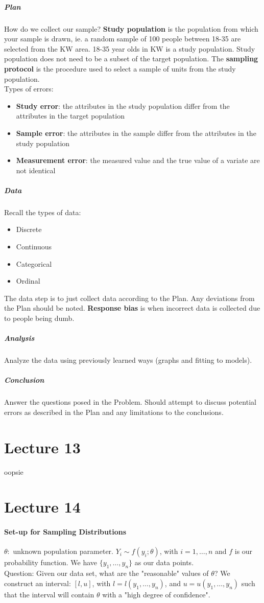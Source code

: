 \documentclass[10pt,letter]{article}
\theoremstyle{plain}
\theoremstyle{definition}
\begin{document}
\subparagraph{Plan}
How do we collect our sample? \textbf{Study population} is the population from which your sample is drawn, ie. a random sample of 100 people between 18-35 are selected from the KW area. 18-35 year olds in KW is a study population. Study population does not need to be a subset of the target population. The \textbf{sampling protocol} is the procedure used to select a sample of units from the study population.\\ 
Types of errors: 
\begin{itemize}
    \item \textbf{Study error}: the attributes in the study population differ from the attributes in the target population
    \item \textbf{Sample error}: the attributes in the sample differ from the attributes in the study population 
    \item \textbf{Measurement error}: the measured value and the true value of a variate are not identical
\end{itemize}


\subparagraph{Data}
Recall the types of data:
\begin{itemize}
    \item Discrete
    \item Continuous
    \item Categorical
    \item Ordinal
\end{itemize}
The data step is to just collect data according to the Plan. Any deviations from the Plan should be noted. \textbf{Response bias} is when incorrect data is collected due to people being dumb.  

\subparagraph{Analysis}
Analyze the data using previously learned ways (graphs and fitting to models). 
\subparagraph{Conclusion}
Answer the questions posed in the Problem. Should attempt to discuss potential errors as described in the Plan and any limitations to the conclusions.

\section*{Lecture 13}
oopsie

\section*{Lecture 14}
\paragraph{Set-up for Sampling Distributions}
$\theta:$ unknown population parameter. $Y_i\sim f(y_i;\theta)$, with $i=1,\ldots,n$ and $f$ is our probability function. We have $\{y_1,\ldots,y_n\}$ as our data points. \\ 
Question: Given our data set, what are the "reasonable" values of $\theta$? We construct an interval: $[l,u]$, with $l=l(y_1,\ldots,y_n)$, and $u=u(y_1,\ldots,y_n)$ such that the interval will contain $\theta$ with a "high degree of confidence". 
\end{document}
